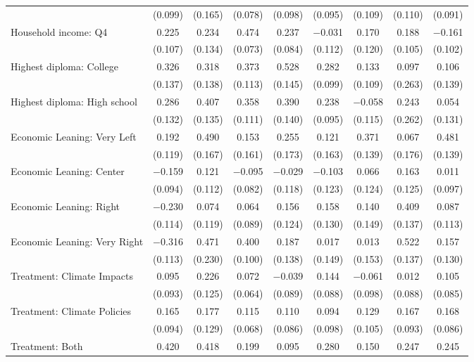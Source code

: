 \begin{tabular}{@{\extracolsep{5pt}}lcccccccc}
  & (0.099) & (0.165) & (0.078) & (0.098) & (0.095) & (0.109) & (0.110) & (0.091) \\ 
  Household income: Q4 & 0.225 & 0.234 & 0.474 & 0.237 & $-$0.031 & 0.170 & 0.188 & $-$0.161 \\ 
  & (0.107) & (0.134) & (0.073) & (0.084) & (0.112) & (0.120) & (0.105) & (0.102) \\ 
  Highest diploma: College & 0.326 & 0.318 & 0.373 & 0.528 & 0.282 & 0.133 & 0.097 & 0.106 \\ 
  & (0.137) & (0.138) & (0.113) & (0.145) & (0.099) & (0.109) & (0.263) & (0.139) \\ 
  Highest diploma: High school & 0.286 & 0.407 & 0.358 & 0.390 & 0.238 & $-$0.058 & 0.243 & 0.054 \\ 
  & (0.132) & (0.135) & (0.111) & (0.140) & (0.095) & (0.115) & (0.262) & (0.131) \\ 
  Economic Leaning: Very Left & 0.192 & 0.490 & 0.153 & 0.255 & 0.121 & 0.371 & 0.067 & 0.481 \\ 
  & (0.119) & (0.167) & (0.161) & (0.173) & (0.163) & (0.139) & (0.176) & (0.139) \\ 
  Economic Leaning: Center & $-$0.159 & 0.121 & $-$0.095 & $-$0.029 & $-$0.103 & 0.066 & 0.163 & 0.011 \\ 
  & (0.094) & (0.112) & (0.082) & (0.118) & (0.123) & (0.124) & (0.125) & (0.097) \\ 
  Economic Leaning: Right & $-$0.230 & 0.074 & 0.064 & 0.156 & 0.158 & 0.140 & 0.409 & 0.087 \\ 
  & (0.114) & (0.119) & (0.089) & (0.124) & (0.130) & (0.149) & (0.137) & (0.113) \\ 
  Economic Leaning: Very Right & $-$0.316 & 0.471 & 0.400 & 0.187 & 0.017 & 0.013 & 0.522 & 0.157 \\ 
  & (0.113) & (0.230) & (0.100) & (0.138) & (0.149) & (0.153) & (0.137) & (0.130) \\ 
  Treatment: Climate Impacts & 0.095 & 0.226 & 0.072 & $-$0.039 & 0.144 & $-$0.061 & 0.012 & 0.105 \\ 
  & (0.093) & (0.125) & (0.064) & (0.089) & (0.088) & (0.098) & (0.088) & (0.085) \\ 
  Treatment: Climate Policies & 0.165 & 0.177 & 0.115 & 0.110 & 0.094 & 0.129 & 0.167 & 0.168 \\ 
  & (0.094) & (0.129) & (0.068) & (0.086) & (0.098) & (0.105) & (0.093) & (0.086) \\ 
  Treatment: Both & 0.420 & 0.418 & 0.199 & 0.095 & 0.280 & 0.150 & 0.247 & 0.245 \\ 

\end{tabular}
